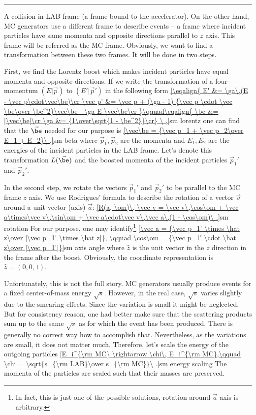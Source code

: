 


\vskip1cm\hrule\vskip1cm

A collision in LAB frame (a frame bound to the accelerator). On the other hand, MC generators use a different frame to describe events -- a frame where incident particles have same momenta and opposite directions parallel to $z$ axis. This frame will be referred as the MC frame. Obviously, we want to find a transformation between these two frames. It will be done in two steps. 

First, we find the Lorentz boost which makes incident particles have equal momenta and opposite directions. If we write the transformation of a four-momentum $(E|\vec p)$ to $(E'|\vec p')$ in the following form
\eqref{\eqalign{
E'      &= \ga\,(E - \vec p\cdot\vec\be)\cr
\vec p' &= \vec p  +  (\ga - 1) {\vec p \cdot \vec \be\over \be^2}\vec\be - \ga E \vec\be\cr
}\qquad\eqalign{
\be &= |\vec\be|\cr
\ga &= {1\over\sqrt{1 - \be^2}}\cr}
\ ,}{sm lorentz}
one can find that the $\vec\be$ needed for our purpose is
\eqref{\vec\be = {\vec p_1 + \vec p_2\over E_1 + E_2}\ ,}{sm beta}
where $\vec p_1, \vec p_2$ are the momenta and $E_1, E_2$ are the energies of the incident particles in the LAB frame. Let's denote this transformation $L(\vec\be)$ and the boosted momenta of the incident particles $\vec p_1'$ and $\vec p_2'$.

In the second step, we rotate the vectors $\vec p_1'$ and $\vec p_2'$ to be parallel to the MC frame $z$ axis. We use Rodrigues' formula to describe the rotation of a vector $\vec v$ around a unit vector (axis) $\vec a$:
\eqref{R(a, \om)\, \vec v = \vec v\,\cos\om + \vec a\times\vec v\,\sin\om + \vec a\cdot\vec v\,\vec a\,(1 - \cos\om)\ .}{sm rotation}
For our purpose, one may identify\footnote{In fact, this is just one of the possible solutions, rotation around $\vec a$ axis is arbitrary.}
\eqref{\vec a = {\vec p_1' \times \hat z\over |\vec p_1' \times \hat z|}, \qquad \cos\om = {\vec p_1' \cdot \hat z\over |\vec p_1'|}}{sm axis angle}
where $\hat z$ is the unit vector in the $z$ direction in the frame after the boost. Obviously, the coordinate representation is $\hat z = (0, 0, 1)$.

Unfortunately, this is not the full story. MC generators usually produce events for a fixed center-of-mass energy $\sqrt{s}$. However, in the real case, $\sqrt{s}$ varies slightly due to the smearing effects. Since the variation is small it might be neglected. But for consistency reason, one had better make sure that the scattering products sum up to the same $\sqrt{s}$ as for which the event has been produced. There is generally no correct way how to accomplish that. Nevertheless, as the variations are small, it does not matter much. Therefore, let's scale the energy of the outgoing particles
\eqref{E_i^{\rm MC} \rightarrow \chi\, E_i^{\rm MC},\qquad \chi = \sqrt{s_{\rm LAB}\over s_{\rm MC}}\ .}{sm energy scaling}
The momenta of the particles are scaled such that their masses are preserved.

